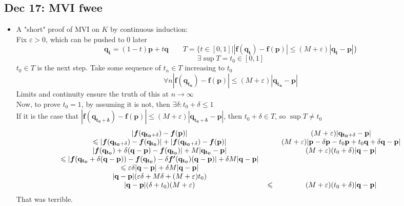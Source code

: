 \documentclass[10pt, oneside]{article}
\let\leq\leqslant
\let\ep\varepsilon
\let\de\delta
\renewcommand{\vec}[1]{\mathbf{#1}}
\newcommand{\vecf}[1]{\boldsymbol{#1}}
\begin{document}
\subsection{Dec 17: MVI fwee}
\begin{itemize}
    \item A "short" proof of MVI on $K$ by continuous induction:\\
        Fix $\ep > 0$, which can be pushed to $0$ later
        \[\vec{q_t} = (1 - t)\vec{p} + t\vec{q} \quad \quad T = \big\{ t\in[0,1] \big| |\vecf{f}(\vec{q_t})- \vecf{f}(\vec{p})| \leq (M+\ep) |\vec{q_t} - \vec{p}|  \big\}\]
        \[\exists \sup T = t_0 \in [0,1]\]
        $t_0 \in T$ is the next step. Take some sequence of $t_n \in T$ increasing to $t_0$
        \[\forall n |\vecf{f}(\vec{q_{t_n}})- \vecf{f}(\vec{p})| \leq (M+\ep) |\vec{q_{t_n}} - \vec{p}|\]
        Limits and continuity ensure the truth of this at $n \rightarrow \infty$\\
        Now, to prove $t_0 = 1$, by assuming it is not, then $\exists \de : t_0 + \de \leq 1$\\
        If it is the case that $|\vecf{f}(\vec{q_{t_0 + \de}})- \vecf{f}(\vec{p})| \leq (M+\ep) |\vec{q_{t_0 + \de}} - \vec{p}|$, then $t_0 + \de \in T$, so $\sup T \neq t_0$
               \[\begin{tabular}{c c c}
            $|\vecf{f}(\vec{q_{t_0 + \de}}) - \vecf{f}(\vec{p})|$ & &$(M+\ep)|\vec{q_{t_0 + \de}} - \vec{p}|$\\
            $\leq |\vecf{f}(\vec{q_{t_0 + \de}}) - \vecf{f}(\vec{q_{t_0}})| + |\vecf{f}(\vec{q_{t_0 + \de}}) - \vecf{f}(\vec{p})|$& &$(M + \ep)|\vec{p} - \de\vec{p} - t_0 \vec{p} + t_0 \vec{q} + \de \vec{q} - \vec{p}|$\\
            $|\vecf{f}(\vec{q_{t_0}) + \de(\vec{q} - \vec{p})} - \vecf{f}(\vec{q_{t_0}})| + M|\vec{q_{t_0}} - \vec{p}| $& &$(M + \ep)(t_0 + \de)|\vec{q} - \vec{p}|$\\
            $\leq |\vecf{f}(\vec{q_{t_0}} + \de(\vec{q} - \vec{p})) - \vecf{f}(\vec{q_{t_0}}) - \de \vecf{f'} (\vec{q_{t_0}}) (\vec{q} - \vec{p})| + \de M |\vec{q} - \vec{p}|$&&\\
            $\leq \ep \de |\vec{q} - \vec{p}| + \de M |\vec{q} - \vec{p}|$&&\\
            $|\vec{q} - \vec{p}|(\ep \de + M \de + (M + \ep) t_0)$&&\\
            $|\vec{q} - \vec{p}|(\de + t_0)(M + \ep)$&$\leq$&$(M + \ep)(t_0 + \de)|\vec{q} - \vec{p}|$\\
            \end{tabular}\]
            That was terrible.
\end{itemize}
\end{document}
